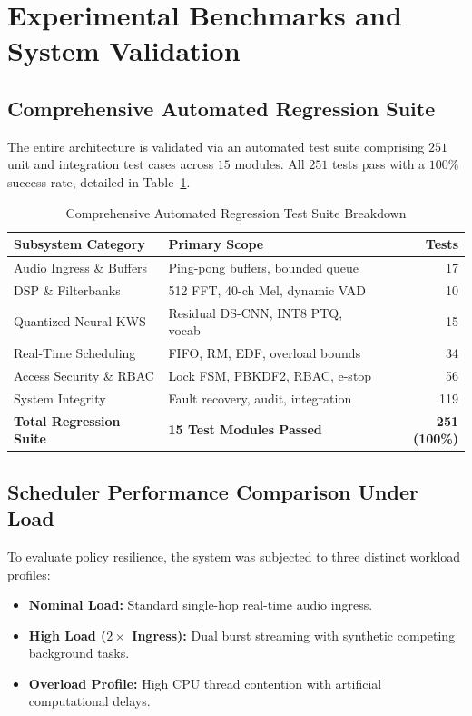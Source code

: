 \documentclass[10pt,twocolumn,letterpaper]{article}
\begin{document}
\section{Experimental Benchmarks and System Validation}

\subsection{Comprehensive Automated Regression Suite}

The entire architecture is validated via an automated test suite comprising $251$ unit and integration test cases across $15$ modules. All $251$ tests pass with a $100\%$ success rate, detailed in Table~\ref{tab:test_suite_summary}.

\begin{table}[htbp]
\centering
\footnotesize
\setlength{\tabcolsep}{3pt}
\caption{Comprehensive Automated Regression Test Suite Breakdown}
\label{tab:test_suite_summary}
\begin{tabularx}{\columnwidth}{lXr}
\toprule
\textbf{Subsystem Category} & \textbf{Primary Scope} & \textbf{Tests} \\
\midrule
Audio Ingress \& Buffers & Ping-pong buffers, bounded queue & 17 \\
DSP \& Filterbanks & 512 FFT, 40-ch Mel, dynamic VAD & 10 \\
Quantized Neural KWS & Residual DS-CNN, INT8 PTQ, vocab & 15 \\
Real-Time Scheduling & FIFO, RM, EDF, overload bounds & 34 \\
Access Security \& RBAC & Lock FSM, PBKDF2, RBAC, e-stop & 56 \\
System Integrity & Fault recovery, audit, integration & 119 \\
\midrule
\textbf{Total Regression Suite} & \textbf{15 Test Modules Passed} & \textbf{251 (100\%)} \\
\bottomrule
\end{tabularx}
\end{table}

\subsection{Scheduler Performance Comparison Under Load}

To evaluate policy resilience, the system was subjected to three distinct workload profiles:
\begin{itemize}
    \item \textbf{Nominal Load:} Standard single-hop real-time audio ingress.
    \item \textbf{High Load ($2\times$ Ingress):} Dual burst streaming with synthetic competing background tasks.
    \item \textbf{Overload Profile:} High CPU thread contention with artificial computational delays.
\end{itemize}
\end{document}
